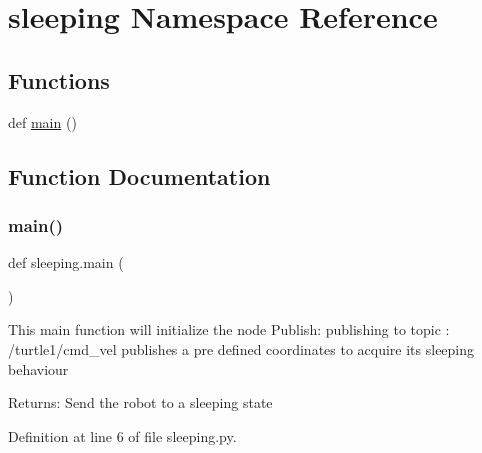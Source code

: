 \hypertarget{namespacesleeping}{}\section{sleeping Namespace Reference}
\label{namespacesleeping}
\subsection*{Functions}
\begin{DoxyCompactItemize}
\item 
def \hyperlink{namespacesleeping_a72b081737a9059b8d653879622e34af8}{main} ()
\end{DoxyCompactItemize}


\subsection{Function Documentation}
\mbox{\label{namespacesleeping_a72b081737a9059b8d653879622e34af8}} 
\subsubsection{\texorpdfstring{main()}{main()}}
{\footnotesize\ttfamily def sleeping.\+main (\begin{DoxyParamCaption}{ }\end{DoxyParamCaption})}

\begin{DoxyVerb}This main function will initialize the node
Publish: publishing to topic : /turtle1/cmd_vel
publishes a pre defined coordinates to acquire its sleeping behaviour

Returns:
    Send the robot to a sleeping state
\end{DoxyVerb}
 

Definition at line 6 of file sleeping.\+py.

